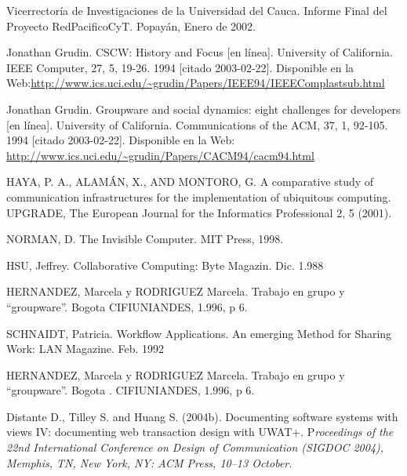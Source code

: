 

\begin{thebibliography}{1}


Vicerrectoría de Investigaciones de la Universidad del Cauca. Informe Final del
Proyecto RedPacificoCyT. Popayán, Enero de 2002.


Jonathan Grudin. CSCW: History and Focus [en línea].
University of California. IEEE Computer, 27, 5, 19-26. 1994 [citado 2003-02-22].
Disponible en
la Web:\url{http://www.ics.uci.edu/~grudin/Papers/IEEE94/IEEEComplastsub.html}


Jonathan Grudin. Groupware and social dynamics: eight challenges for
developers [en línea]. University of California. Communications of the ACM, 37,
1, 92-105. 1994 [citado 2003-02-22]. Disponible en la Web:
\url{http://www.ics.uci.edu/~grudin/Papers/CACM94/cacm94.html}

HAYA, P. A., ALAMÁN, X., AND MONTORO, G. A comparative study of
communication infrastructures for the implementation of ubiquitous computing.
UPGRADE, The European Journal for the Informatics Professional
2, 5 (2001).

NORMAN, D. The Invisible Computer. MIT Press, 1998.

HSU, Jeffrey. Collaborative Computing: Byte Magazin. Dic. 1.988


HERNANDEZ, Marcela y RODRIGUEZ Marcela. Trabajo en grupo y “groupware”.
Bogota CIFIUNIANDES, 1.996, p 6.

 SCHNAIDT, Patricia. Workflow Applications. An
emerging Method for Sharing Work: LAN Magazine. Feb. 1992


 HERNANDEZ, Marcela y RODRIGUEZ Marcela. Trabajo
en grupo y “groupware”. Bogota . CIFIUNIANDES, 1.996, p 6.



 Distante  D., Tilley S. and Huang S. (2004b).
{Documenting
software systems with views IV:
documenting web transaction design with UWAT+.} P\textit{roceedings of the 22nd
International
Conference on Design of Communication (SIGDOC 2004), Memphis, TN, New York, NY:
ACM Press, 10–13 October.}


\end{thebibliography}
